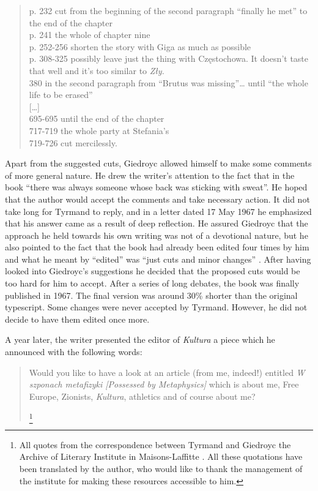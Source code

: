 \begin{paper}
\begin{quote}
p. 232 cut from the beginning of the second paragraph ``finally he met''
to the end of the chapter\\
p. 241 the whole of chapter nine\\
p. 252-256 shorten the story with Giga as much as possible\\
p. 308-325 possibly leave just the thing with Częstochowa. It doesn't
taste that well and it's too similar to \emph{Zły}.\\
380 in the second paragraph from ``Brutus was missing''\ldots{} until ``the
whole life to be erased''\\
{[}\ldots{}{]}\\
695-695 until the end of the chapter\\
717-719 the whole party at Stefania's\\
719-726 cut mercilessly.  
\begin{flushright}
\citep{tyrmand_kor_1966}
\end{flushright}
\end{quote}


\noindent Apart from the suggested cuts, Giedroyc allowed himself to make some
comments of more general nature. He drew the writer's attention to the
fact that in the book ``there was always someone whose back was sticking
with sweat''. He hoped that the author would accept the comments and take
necessary action. It did not take long for Tyrmand to reply, and in a
letter dated 17 May 1967 he emphasized that his
answer came as a result of deep reflection. He assured Giedroyc that the
approach he held towards his own writing was not of a devotional nature,
but he also pointed to the fact that the book had already been edited
four times by him and what he meant by ``edited'' was ``just cuts and
minor changes'' \citep{tyrmand_kor_1966}. After having looked into Giedroyc's suggestions he
decided that the proposed cuts would be too hard for him to accept. After a series of long debates, the book was finally published in 1967. The final version
was around 30\% shorter than the original typescript. Some changes were
never accepted by Tyrmand. However, he did not decide to have them edited once more.

A year later, the writer presented the editor of \emph{Kultura} a piece
which he announced with the following words: 

\begin{quote}
Would you like to have a
look at an article (from me, indeed!) entitled \emph{W szponach
metafizyki [Possessed by Metaphysics]} which is about me, Free
Europe, Zionists, \emph{Kultura}, athletics and of course about me? 
\begin{flushright}
\citep[2 July 1968]{tyrmand_kor_1966}\footnote{All quotes from the correspondence between Tyrmand and Giedroyc the Archive of Literary
  Institute in Maisons-Laffitte \citep{tyrmand_kor_1966}. All  these quotations have been translated by the author, who would like to thank the management of
  the institute for making these resources accessible to him.}
\end{flushright}
\end{quote}


\end{paper}
